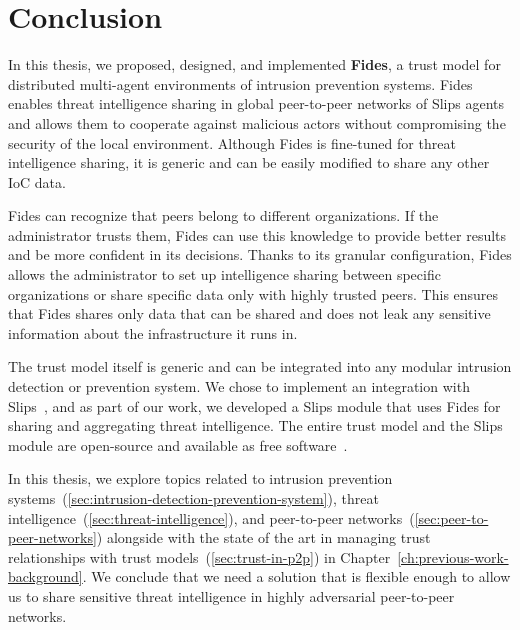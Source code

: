 \chapter{Conclusion}
\label{ch:conclusion}

In this thesis, we proposed, designed, and implemented \textbf{Fides}, a trust model for distributed multi-agent environments of intrusion prevention systems.
Fides enables threat intelligence sharing in global peer-to-peer networks of Slips agents and allows them to cooperate against malicious actors without compromising the security of the local environment. 
Although Fides is fine-tuned for threat intelligence sharing, it is generic and can be easily modified to share any other IoC data.

Fides can recognize that peers belong to different organizations. If the administrator trusts them, Fides can use this knowledge to provide better results and be more confident in its decisions.
Thanks to its granular configuration, Fides allows the administrator to set up intelligence sharing between specific organizations or share specific data only with highly trusted peers.
This ensures that Fides shares only data that can be shared and does not leak any sensitive information about the infrastructure it runs in.

The trust model itself is generic and can be integrated into any modular intrusion detection or prevention system. We chose to implement an integration with Slips~\cite{slips}, and as part of our work, we developed a Slips module that uses Fides for sharing and aggregating threat intelligence.
The entire trust model and the Slips module are open-source and available as free software~\cite{fidesGithub}.

In this thesis, we explore topics related to intrusion prevention systems~(\ref{sec:intrusion-detection-prevention-system}), threat intelligence~(\ref{sec:threat-intelligence}), and peer-to-peer networks~(\ref{sec:peer-to-peer-networks}) alongside with the state of the art in managing trust relationships with trust models~(\ref{sec:trust-in-p2p}) in Chapter~\ref{ch:previous-work-background}.
We conclude that we need a solution that is flexible enough to allow us to share sensitive threat intelligence in highly adversarial peer-to-peer networks.

